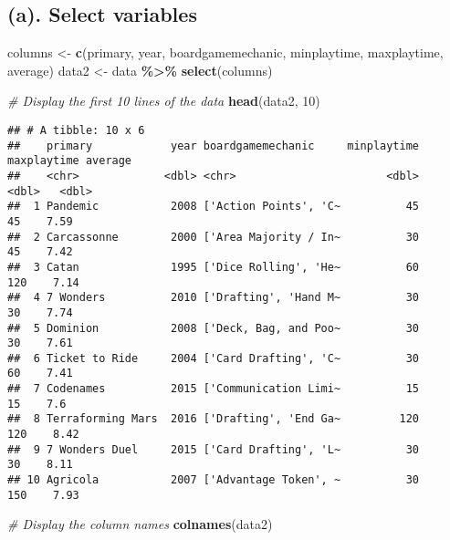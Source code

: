 \documentclass[
]{article}
\newenvironment{Shaded}{\begin{snugshade}}{\end{snugshade}}
\newcommand{\CommentTok}[1]{\textcolor[rgb]{0.56,0.35,0.01}{\textit{#1}}}
\newcommand{\DecValTok}[1]{\textcolor[rgb]{0.00,0.00,0.81}{#1}}
\newcommand{\FunctionTok}[1]{\textcolor[rgb]{0.13,0.29,0.53}{\textbf{#1}}}
\newcommand{\NormalTok}[1]{#1}
\newcommand{\OtherTok}[1]{\textcolor[rgb]{0.56,0.35,0.01}{#1}}
\newcommand{\SpecialCharTok}[1]{\textcolor[rgb]{0.81,0.36,0.00}{\textbf{#1}}}
\newcommand{\StringTok}[1]{\textcolor[rgb]{0.31,0.60,0.02}{#1}}
\begin{document}
\hypertarget{a.-select-variables}{%
\subsection{(a). Select variables}\label{a.-select-variables}}

\begin{Shaded}
\begin{Highlighting}[]
\NormalTok{columns }\OtherTok{\textless{}{-}} \FunctionTok{c}\NormalTok{(}\StringTok{\textquotesingle{}primary\textquotesingle{}}\NormalTok{, }\StringTok{\textquotesingle{}year\textquotesingle{}}\NormalTok{, }\StringTok{\textquotesingle{}boardgamemechanic\textquotesingle{}}\NormalTok{,}
             \StringTok{\textquotesingle{}minplaytime\textquotesingle{}}\NormalTok{, }\StringTok{\textquotesingle{}maxplaytime\textquotesingle{}}\NormalTok{, }\StringTok{\textquotesingle{}average\textquotesingle{}}\NormalTok{)}
\NormalTok{data2 }\OtherTok{\textless{}{-}}\NormalTok{ data }\SpecialCharTok{\%\textgreater{}\%} \FunctionTok{select}\NormalTok{(columns)}

\CommentTok{\# Display the first 10 lines of the data}
\FunctionTok{head}\NormalTok{(data2, }\DecValTok{10}\NormalTok{)}
\end{Highlighting}
\end{Shaded}

\begin{verbatim}
## # A tibble: 10 x 6
##    primary            year boardgamemechanic     minplaytime maxplaytime average
##    <chr>             <dbl> <chr>                       <dbl>       <dbl>   <dbl>
##  1 Pandemic           2008 ['Action Points', 'C~          45          45    7.59
##  2 Carcassonne        2000 ['Area Majority / In~          30          45    7.42
##  3 Catan              1995 ['Dice Rolling', 'He~          60         120    7.14
##  4 7 Wonders          2010 ['Drafting', 'Hand M~          30          30    7.74
##  5 Dominion           2008 ['Deck, Bag, and Poo~          30          30    7.61
##  6 Ticket to Ride     2004 ['Card Drafting', 'C~          30          60    7.41
##  7 Codenames          2015 ['Communication Limi~          15          15    7.6 
##  8 Terraforming Mars  2016 ['Drafting', 'End Ga~         120         120    8.42
##  9 7 Wonders Duel     2015 ['Card Drafting', 'L~          30          30    8.11
## 10 Agricola           2007 ['Advantage Token', ~          30         150    7.93
\end{verbatim}

\begin{Shaded}
\begin{Highlighting}[]
\CommentTok{\# Display the column names}
\FunctionTok{colnames}\NormalTok{(data2)}
\end{Highlighting}
\end{Shaded}
\end{document}
